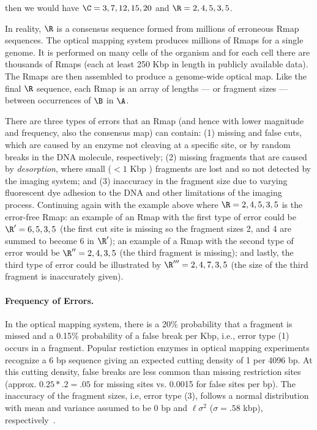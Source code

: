 \documentclass[doctor]{thesis}
\begin{document}
\noindent then we would have $\C = 3,7,12,15,20$ and $\R = 2,4,5,3,5$.  

In reality, $\R$ is a consensus sequence formed from millions of erroneous Rmap sequences.
The optical mapping system produces millions of Rmaps for a single genome. It is performed on many cells of the organism and for each cell there are thousands of Rmaps (each at least 250 Kbp in length in publicly available data).
The Rmaps are then assembled to produce a genome-wide optical map.
Like the final $\R$ sequence, each Rmap is an array of lengths --- or fragment sizes --- between occurrences of $\B$ in $\A$.

There are three types of errors that an Rmap (and hence with lower magnitude and frequency, also the consensus map) can contain: (1) missing and false cuts, which are caused by an enzyme not cleaving at a specific site, or by random breaks in the DNA molecule, respectively; (2) missing fragments that are caused by {\em desorption}, where small ($ < 1$ Kbp ) fragments are lost and so not detected by the imaging system; and (3) inaccuracy in the fragment size due to varying fluorescent dye adhesion to the DNA and other limitations of the imaging process.  Continuing again with the example above where $\R = 2,4,5,3,5$ is the error-free Rmap: an example of an Rmap with the first type of error could be $\R' = 6,5,3,5$ (the first cut site is missing so the fragment sizes 2, and 4 are summed to become 6 in $\R'$); an example of a Rmap with the second type of error would be $\R'' = 2,4,3,5$ (the third fragment is missing); and lastly, the third type of error could be illustrated by $\R''' = 2,4,7,3,5$ (the size of the third fragment is inaccurately given).  
\paragraph{Frequency of Errors.} In the optical mapping system, there is a 20\% probability that a fragment is missed and a 0.15\% probability of a false break per Kbp, i.e., error type (1) occurs in a fragment.  Popular restiction enzymes in optical mapping experiments recognize a 6 bp sequence giving an expected cutting density of 1 per 4096 bp.  At this cutting density, false breaks are less common than missing restriction sites (approx. $0.25 * .2 = .05$ for missing sites vs. 0.0015 for false sites per bp).  The inaccuracy of the fragment sizes, i.e, error type (3), follows a normal distribution with mean and variance assumed to be 0 bp and $\ell \sigma^2$ ($\sigma = .58$ kbp), respectively~\cite{Valouev06}. 
 
\end{document}
